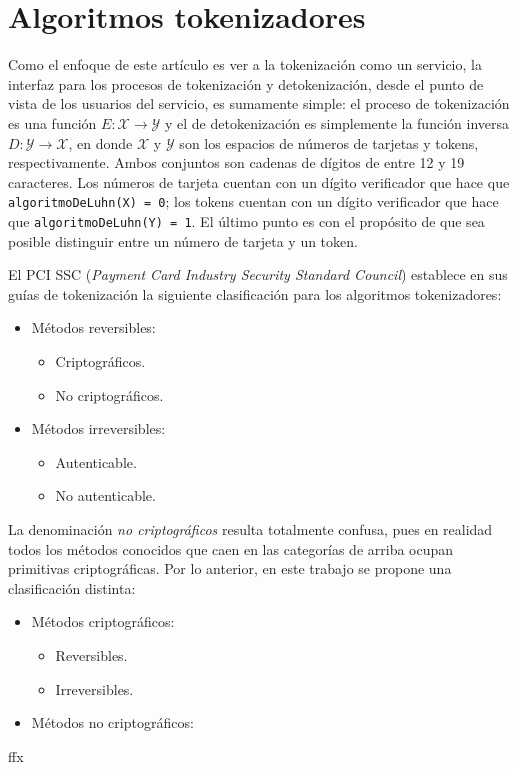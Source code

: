 %
%

\section{Algoritmos tokenizadores}

Como el enfoque de este artículo es ver a la tokenización como un servicio, la
interfaz para los procesos de tokenización y detokenización, desde el punto de
vista de los usuarios del servicio, es sumamente simple: el proceso de
tokenización es una función $ E: \mathcal{X} \rightarrow \mathcal{Y} $ y el de
detokenización es  simplemente la función inversa $ D: \mathcal{Y} \rightarrow
\mathcal{X} $, en donde $ \mathcal{X} $ y $ \mathcal{Y} $ son los espacios de
números de tarjetas y tokens, respectivamente. Ambos conjuntos son cadenas de
dígitos de entre 12 y 19 caracteres. Los números de tarjeta cuentan con un
dígito verificador que hace que \texttt{algoritmoDeLuhn(X) = 0}; los tokens
cuentan con un dígito verificador que hace que \texttt{algoritmoDeLuhn(Y) = 1}.
El último punto es con el propósito de que sea posible distinguir entre un
número de tarjeta y un token.

El PCI SSC (\textit{Payment Card Industry Security Standard Council}) establece
en sus guías de tokenización la siguiente clasificación para los algoritmos
tokenizadores\cite{pci_tokens}:


\begin{itemize}
  \item Métodos reversibles:
  \begin{itemize}
    \item Criptográficos.
    \item No criptográficos.
  \end{itemize}
  \item Métodos irreversibles:
  \begin{itemize}
    \item Autenticable.
    \item No autenticable.
  \end{itemize}
\end{itemize}

La denominación \textit{no criptográficos} resulta totalmente confusa, pues en
realidad todos los métodos conocidos que caen en las categorías de arriba ocupan
primitivas criptográficas. %
Por lo anterior, en este trabajo se propone una clasificación distinta:


\begin{itemize}
  \item Métodos criptográficos:
  \begin{itemize}
    \item Reversibles.
    \item Irreversibles.
  \end{itemize}
  \item Métodos no criptográficos:
\end{itemize}

{ffx}
